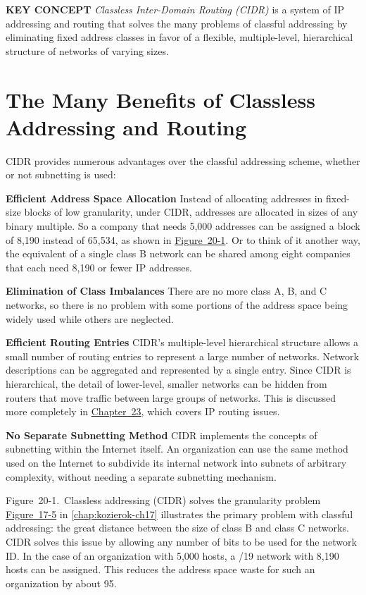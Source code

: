 {\textbf{KEY CONCEPT}} {\emph{Classless Inter-Domain Routing (CIDR)}} is
a system of IP addressing and routing that solves the many problems of
classful addressing by eliminating fixed address classes in favor of a
flexible, multiple-level, hierarchical structure of networks of varying
sizes.

\section{The Many Benefits of Classless Addressing and Routing}

CIDR provides numerous advantages over the classful addressing scheme,
whether or not subnetting is used:

{\textbf{Efficient Address Space Allocation}} Instead of allocating
addresses in fixed-size blocks of low granularity, under CIDR, addresses
are allocated in sizes of any binary multiple. So a company that needs
5,000 addresses can be assigned a block of 8,190 instead of 65,534, as
shown in
\protect\hyperlink{ch20.htmlux5cux23classless_addressing_cidr_solves_the_gra}{Figure~20-1}.
Or to think of it another way, the equivalent of a single class B
network can be shared among eight companies that each need 8,190 or
fewer IP addresses.

{\textbf{Elimination of Class Imbalances}} There are no more class A, B,
and C networks, so there is no problem with some portions of the address
space being widely used while others are neglected.

{\textbf{Efficient Routing Entries}} CIDR's multiple-level hierarchical
structure allows a small number of routing entries to represent a large
number of networks. Network descriptions can be aggregated and
represented by a single entry. Since CIDR is hierarchical, the detail of
lower-level, smaller networks can be hidden from routers that move
traffic between large groups of networks. This is discussed more
completely in \protect\hyperlink{ch23.html}{Chapter~23}, which covers IP
routing issues.

{\textbf{No Separate Subnetting Method}} CIDR implements the concepts of
subnetting within the Internet itself. An organization can use the same
method used on the Internet to subdivide its internal network into
subnets of arbitrary complexity, without needing a separate subnetting
mechanism.





Figure~20-1.~Classless addressing (CIDR) solves the granularity problem
\protect\hyperlink{ch17s07.htmlux5cux23the_main_problem_with_classful_addressin}{Figure~17-5}
in \vref{chap:kozierok-ch17} illustrates the primary
problem with classful addressing: the great distance between the size of
class B and class C networks. CIDR solves this issue by allowing any
number of bits to be used for the network ID. In the case of an
organization with 5,000 hosts, a /19 network with 8,190 hosts can be
assigned. This reduces the address space waste for such an organization
by about 95.

